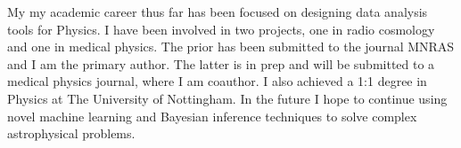 My my academic career thus far has been focused on designing data analysis tools for Physics. I have been involved in two projects, one in radio cosmology and one in medical physics. The prior has been submitted to the journal MNRAS and I am the primary author. The latter is in prep and will be submitted to a medical physics journal, where I am coauthor. I also achieved a 1:1 degree in Physics at The University of Nottingham. In the future I hope to continue using novel machine learning and Bayesian inference techniques to solve complex astrophysical problems.



